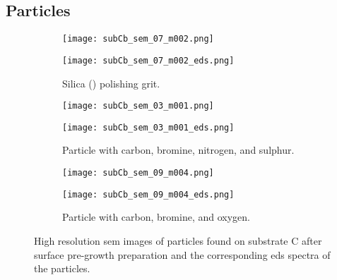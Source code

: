 \subsection{Particles}

\begin{figure}
    \centering
    \begin{subfigure}[t]{\textwidth}
          \begin{minipage}[t]{0.49\linewidth}
            \centering
            \texttt{[image: subCb\_sem\_07\_m002.png]}
          \end{minipage}
          \hfill
          \begin{minipage}[t]{0.49\linewidth}
            \centering
            \texttt{[image: subCb\_sem\_07\_m002\_eds.png]}
          \end{minipage}
        \caption{Silica () polishing grit.}\label{fig:subCb_silica}
    \end{subfigure}
    \par\bigskip
    \begin{subfigure}[t]{\textwidth}
          \begin{minipage}[t]{0.49\linewidth}
            \centering
            \texttt{[image: subCb\_sem\_03\_m001.png]}
          \end{minipage}
          \hfill
          \begin{minipage}[t]{0.49\linewidth}
            \centering
            \texttt{[image: subCb\_sem\_03\_m001\_eds.png]}
          \end{minipage}
        \caption{Particle with carbon, bromine, nitrogen, and sulphur.}\label{fig:subCb_Br-etch}
    \end{subfigure}
    \par\bigskip
    \begin{subfigure}[t]{\textwidth}
          \begin{minipage}[t]{0.49\linewidth}
            \centering
            \texttt{[image: subCb\_sem\_09\_m004.png]}
          \end{minipage}
          \hfill
          \begin{minipage}[t]{0.49\linewidth}
            \centering
            \texttt{[image: subCb\_sem\_09\_m004\_eds.png]}
          \end{minipage}
        \caption{Particle with carbon, bromine, and oxygen.}\label{fig:subCb_Br-etch2}
    \end{subfigure}
    \caption[\Ac{sem} images and \ac{eds} spectra of particles found on substrate C after surface pre-growth preparation.]{High resolution \acf{sem} images of particles found on substrate C after surface pre-growth preparation and the corresponding \acf{eds} spectra of the particles.}\label{fig:subCb_sem_w_eds}
\end{figure}

